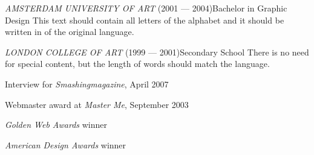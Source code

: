 \documentclass[a4paper, 12pt]{classycv}
\begin{document}
\begin{Resume}[%
    left background color=accent-color%
    , left foreground color=white%
    , left header color=white%
    , delimiter color=white%
    , delimiter width=0pt%
]
    \begin{Entry}[skip above=0pt]{\textit{\MakeUppercase{Amsterdam University of Art}} (2001 --- 2004)}{Bachelor in Graphic Design}%
        This text should contain all letters of the alphabet and it should be written in of the original language.%
    \end{Entry}%
    \begin{Entry}[skip above=0pt]{\textit{\MakeUppercase{London College of Art}} (1999 --- 2001)}{Secondary School}%
        There is no need for special content, but the length of words should match the language.%
    \end{Entry}%
    \begin{List}[skip above=0pt, skip below=0pt]
        \item Interview for \textit{Smashingmagazine}, April 2007%
        \item Webmaster award at \textit{Master Me}, September 2003%
        \item \textit{Golden Web Awards} winner%
        \item \textit{American Design Awards} winner%
    \end{List}%
\end{Resume}
\end{document}
